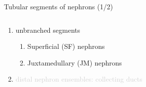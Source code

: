 \documentclass{beamer}
\begin{document}
\begin{frame}{Tubular segments of nephrons (1/2)}
    \begin{columns}
        \begin{column}{0.5\linewidth}
            \begin{enumerate}
                \item unbranched segments
                \begin{enumerate}
                    \item Superficial (SF) nephrons
                    \item Juxtamedullary (JM) nephrons
                \end{enumerate}
                \item \textcolor<2->{lightgray}{distal nephron ensembles: collecting ducts}
            \end{enumerate}
        \end{column}\hfill
        \begin{column}{0.5\linewidth}
\end{column}
\end{columns}
\end{frame}
\end{document}
